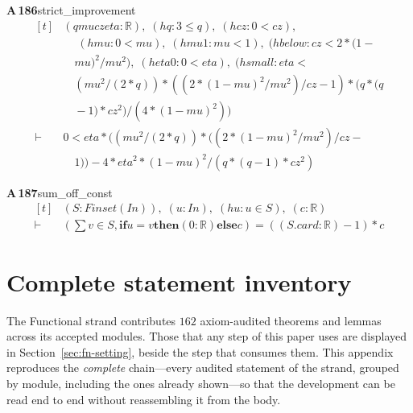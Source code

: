 \documentclass[conference]{IEEEtran}
\theoremstyle{definition}
\newcommand{\lean}[1]{\textsf{\footnotesize #1}}
\begin{document}
\noindent\textbf{A\,186}\quad\lean{strict\_improvement}
{\footnotesize\[ \begin{aligned}[t]
&(\mathit{q} \mathit{mu} \mathit{cz} \mathit{eta} : \mathbb{R} ),\; (\mathit{hq} : 3 \leq \mathit{q}),\; (\mathit{hcz} : 0 < \mathit{cz}),\\
&\quad \; (\mathit{hmu} : 0 < \mathit{mu}),\; (\mathit{hmu1} : \mathit{mu} < 1),\; (\mathit{hbelow} : \mathit{cz} < 2*(1-\\
&\quad \mathit{mu})^{2}/\mathit{mu}^{2}),\; (\mathit{heta0} : 0 < \mathit{eta}),\; (\mathit{hsmall} : \mathit{eta} <\\
&\quad (\mathit{mu}^{2}/(2*\mathit{q}))*((2*(1-\mathit{mu})^{2}/\mathit{mu}^{2})/\mathit{cz}-1)*(\mathit{q}*(\mathit{q}\\
&\quad -1)*\mathit{cz}^{2})/(4*(1-\mathit{mu})^{2}))\\
\vdash\;&0 < \mathit{eta}*((\mathit{mu}^{2}/(2*\mathit{q}))*((2*(1-\mathit{mu})^{2}/\mathit{mu}^{2})/\mathit{cz}-\\
&\quad 1))-4*\mathit{eta}^{2}*(1-\mathit{mu})^{2}/(\mathit{q}*(\mathit{q}-1)*\mathit{cz}^{2})
\end{aligned} \]}

\noindent\textbf{A\,187}\quad\lean{sum\_off\_const}
{\footnotesize\[ \begin{aligned}[t]
&(\mathit{S} : \mathit{Finset} (\mathit{I} \mathit{n})),\; (\mathit{u} : \mathit{I} \mathit{n}),\; (\mathit{hu} : \mathit{u} \in \mathit{S}),\; (\mathit{c} : \mathbb{R} )\\
\vdash\;&(\textstyle\sum \mathit{v} \in \mathit{S}, \mathbf{if} \mathit{u} = \mathit{v} \mathbf{then} (0:\mathbb{R} ) \mathbf{else} \mathit{c}) = ((\mathit{S}.\mathit{card} : \mathbb{R} )-1)*\mathit{c}
\end{aligned} \]}

\section{Complete statement inventory}
\label{app:fn-inventory}

The Functional strand contributes $162$ axiom-audited theorems and lemmas across its accepted modules. Those that any step of this paper uses are displayed in Section~\ref{sec:fn-setting}, beside the step that consumes them. This appendix reproduces the \emph{complete} chain---every audited statement of the strand, grouped by module, including the ones already shown---so that the development can be read end to end without reassembling it from the body.
\end{document}
